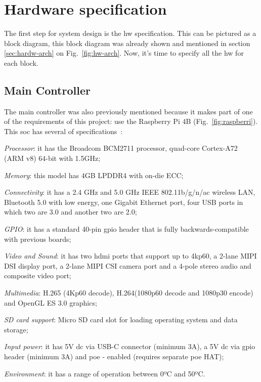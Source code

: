 %
\section{Hardware specification}
\label{sec:hw-specs}
The first step for system design is the \gls{hw} specification. This can be pictured as a block diagram, this block diagram was already shown and mentioned in section \ref{sec:hardw-arch} on Fig.~\ref{fig:hw-arch}.
Now, it's time to specify all the \gls{hw} for each block.

\subsection{Main Controller}
\label{sec:main-contr}

The main controller was also previously mentioned because it makes part of one of the requirements of this project: use the Raspberry Pi 4B (Fig.~\ref{fig:raspberri}).
This \gls{soc} has several of specifications~\cite{rasp-specs}:
%
\begin{item-c}
\item \emph{Processor}: it has the Broadcom BCM2711 processor, quad-core Cortex-A72 (ARM v8) 64-bit with 1.5GHz;
%
\item \emph{Memory}: this model has 4GB LPDDR4 with on-die ECC;
%
\item \emph{Connectivity}: it has a 2.4 GHz and 5.0 GHz IEEE 802.11b/g/n/ac wireless LAN, Bluetooth 5.0 with low energy, one Gigabit Ethernet port, four USB ports in which two are 3.0 and another two are 2.0;
%
\item \emph{GPIO}: it has a standard 40-pin \gls{gpio} header that is fully backwards-compatible with previous boards;
%
\item \emph{Video and Sound}: it has two \gls{hdmi} ports that support up to 4kp60, a 2-lane MIPI DSI display port, a 2-lane MIPI CSI camera port and a 4-pole stereo audio and composite video port;
%
\item \emph{Multimedia}: H.265 (4Kp60 decode), H.264(1080p60 decode and 1080p30 encode) and OpenGL ES 3.0 graphics;
%
\item \emph{SD card support}: Micro SD card slot for loading operating system and data storage;
%
\item \emph{Input power}: it has 5V \gls{dc} via USB-C connector (minimum 3A), a 5V \gls{dc} via \gls{gpio} header (minimum 3A) and \gls{poe} - enabled (requires separate \gls{poe} HAT);
%
\item \emph{Environment}: it has a range of operation between 0ºC and 50ºC.
\end{item-c}
